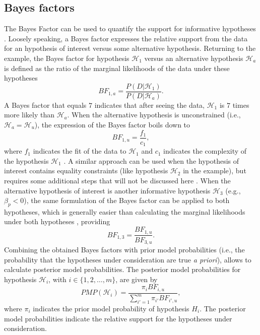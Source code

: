 \documentclass[]{interact}
\theoremstyle{plain}%
\theoremstyle{definition}
\theoremstyle{remark}
\begin{document}
\hypertarget{bayes-factors}{%
\subsection{Bayes factors}\label{bayes-factors}}

The Bayes Factor \citep{kass_raftery_bayes_factors_1995} can be used to
quantify the support for informative hypotheses
\citep{beland2012informative, hoijtink_informative_2012, hoijtink2019tutorial}.
Loosely speaking, a Bayes factor expresses the relative support from the
data for an hypothesis of interest versus some alternative hypothesis.
Returning to the example, the Bayes factor for hypothesis
\(\mathcal{H}_1\) versus an alternative hypothesis \(\mathcal{H}_a\) is
defined as the ratio of the marginal likelihoods of the data under these
hypotheses \[
BF_{1,a} = \frac{P(D|\mathcal{H}_1)}{P(D|\mathcal{H}_a)}.
\] A Bayes factor that equals \(7\) indicates that after seeing the
data, \(\mathcal{H}_1\) is \(7\) times more likely than
\(\mathcal{H}_a\). When the alternative hypothesis is unconstrained
(i.e., \(\mathcal{H}_a = \mathcal{H}_u\)), the expression of the Bayes
factor boils down to \[
BF_{1,u} = \frac{f_1}{c_1},
\] where \(f_1\) indicates the fit of the data to \(\mathcal{H}_1\) and
\(c_1\) indicates the complexity of the hypothesis \(\mathcal{H}_1\)
\citep[e.g.,][]{beland2012informative, klugkist_inequality_2005}. A
similar approach can be used when the hypothesis of interest contains
equality constraints (like hypothesis \(\mathcal{H}_2\) in the example),
but requires some additional steps that will not be discussed here
\citep[see e.g.,][]{mulder_equality_2010, klugkist_inequality_2005}.
When the alternative hypothesis of interest is another informative
hypothesis \(\mathcal{H}_{3}\) (e.g., \(\beta_p < 0\)), the same
formulation of the Bayes factor can be applied to both hypotheses, which
is generally easier than calculating the marginal likelihoods under both
hypotheses \citep{klugkist_inequality_2005}, providing \[
BF_{1,3} = \frac{BF_{1,u}}{BF_{3,u}}.
\] Combining the obtained Bayes factors with prior model probabilities
(i.e., the probability that the hypotheses under consideration are true
\emph{a priori}), allows to calculate posterior model probabilities. The
posterior model probabilities for hypothesis \(\mathcal{H}_i\), with
\(i \in \{1, 2, \dots, m\}\), are given by \[
PMP(\mathcal{H}_{i}) = \frac{\pi_i BF_{i,u}}{\sum^m_{i'=1} \pi_{i'} BF_{i',u}},
\] where \(\pi_i\) indicates the prior model probability of hypothesis
\(H_i\). The posterior model probabilities indicate the relative support
for the hypotheses under consideration.
\end{document}
